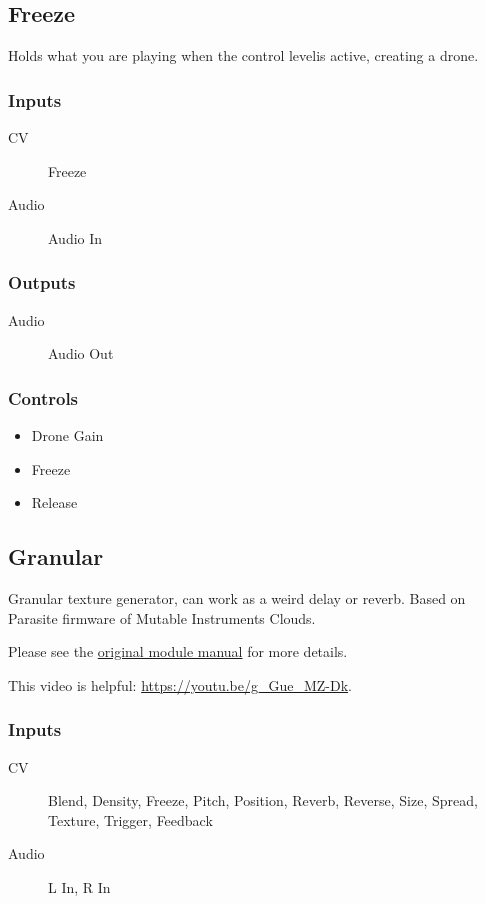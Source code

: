 \subsection{Freeze}

Holds what you are playing when the control levelis active, creating a drone.



\subsubsection{Inputs}
\begin{description}
\item [CV] Freeze
\item [Audio] Audio In
\end{description}

\subsubsection{Outputs}
\begin{description}
\item [Audio] Audio Out
\end{description}

\subsubsection{Controls}
\begin{itemize}
\item Drone Gain
\item Freeze
\item Release
\end{itemize}

\subsection{Granular}

Granular texture generator, can work as a weird delay or reverb. Based on Parasite firmware of Mutable Instruments Clouds.



Please see the \href{https://www.mutable-instruments.net/modules/clouds/manual/}{original module manual} for more details.

This video is helpful: \url{https://youtu.be/g_Gue_MZ-Dk}.

\subsubsection{Inputs}
\begin{description}
\item [CV] Blend, Density, Freeze, Pitch, Position, Reverb, Reverse, Size, Spread, Texture, Trigger, Feedback
\item [Audio] L In, R In
\end{description}

